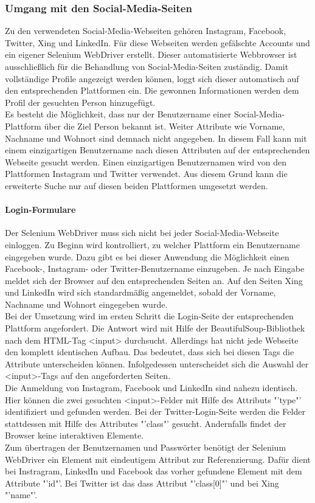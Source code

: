 			\subsubsection{Umgang mit den Social-Media-Seiten}
			\label{subsubsec:SocialMediaSeiten}
			Zu den verwendeten Social-Media-Webseiten gehören Instagram, Facebook, Twitter, Xing und LinkedIn. Für diese Webseiten werden gefälschte Accounts und ein eigener Selenium WebDriver erstellt. Dieser automatisierte Webbrowser ist ausschließlich für die Behandlung von Social-Media-Seiten zuständig. Damit vollständige Profile angezeigt werden können, loggt sich dieser automatisch auf den entsprechenden Plattformen ein. Die gewonnen Informationen werden dem Profil der gesuchten Person hinzugefügt.\\
			Es besteht die Möglichkeit, dass nur der Benutzername einer Social-Media-Plattform über die Ziel Person bekannt ist. Weiter Attribute wie Vorname, Nachname und Wohnort sind demnach nicht angegeben. In diesem Fall kann mit einem einzigartigen Benutzername nach diesen Attributen auf der entsprechenden Webseite gesucht werden. Einen einzigartigen Benutzernamen wird von den Plattformen Instagram und Twitter verwendet. Aus diesem Grund kann die erweiterte Suche nur auf diesen beiden Plattformen umgesetzt werden.
			
			\paragraph{Login-Formulare}
			Der Selenium WebDriver muss sich nicht bei jeder Social-Media-Webseite einloggen. Zu Beginn wird kontrolliert, zu welcher Plattform ein Benutzername eingegeben wurde. Dazu gibt es bei dieser Anwendung die Möglichkeit einen Facebook-, Instagram- oder Twitter-Benutzername einzugeben. Je nach Eingabe meldet sich der Browser auf den entsprechenden Seiten an. Auf den Seiten Xing und LinkedIn wird sich standardmäßig  angemeldet, sobald der Vorname, Nachname und Wohnort eingegeben wurde.\\
			Bei der Umsetzung wird im ersten Schritt die Login-Seite der entsprechenden Plattform angefordert. Die Antwort wird mit Hilfe der BeautifulSoup-Bibliothek nach dem HTML-Tag <input> durchsucht. Allerdings hat nicht jede Webseite den komplett identischen Aufbau. Das bedeutet, dass sich bei diesen Tags die Attribute unterscheiden können. Infolgedessen unterscheidet sich die Auswahl der <input>-Tags auf den angeforderten Seiten.\\
			Die Anmeldung von Instagram, Facebook und LinkedIn sind nahezu identisch. Hier können die zwei gesuchten <input>-Felder mit Hilfe des Attributs "'type"' identifiziert und gefunden werden. Bei der Twitter-Login-Seite werden die Felder stattdessen mit Hilfe des Attributes "'class"' gesucht. Andernfalls findet der Browser keine interaktiven Elemente.\\
			Zum übertragen der Benutzernamen und Passwörter benötigt der Selenium WebDriver ein Element mit eindeutigem Attribut zur Referenzierung. Dafür dient bei Instragram, LinkedIn und Facebook das vorher gefundene Element mit dem Attribute "'id"'. Bei Twitter ist das dass Attribut "'class[0]"' und bei Xing "'name"'.
			 
